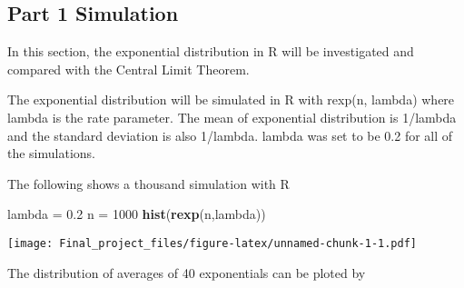 \documentclass[
]{article}
\author{Pulan Yu}
\date{2/24/2020}
\newenvironment{Shaded}{\begin{snugshade}}{\end{snugshade}}
\newcommand{\DecValTok}[1]{\textcolor[rgb]{0.00,0.00,0.81}{#1}}
\newcommand{\FloatTok}[1]{\textcolor[rgb]{0.00,0.00,0.81}{#1}}
\newcommand{\KeywordTok}[1]{\textcolor[rgb]{0.13,0.29,0.53}{\textbf{#1}}}
\newcommand{\NormalTok}[1]{#1}
\newcommand{\StringTok}[1]{\textcolor[rgb]{0.31,0.60,0.02}{#1}}
\begin{document}
\hypertarget{part-1-simulation}{%
\subsection{Part 1 Simulation}\label{part-1-simulation}}

In this section, the exponential distribution in R will be investigated
and compared with the Central Limit Theorem.

The exponential distribution will be simulated in R with rexp(n, lambda)
where lambda is the rate parameter. The mean of exponential distribution
is 1/lambda and the standard deviation is also 1/lambda. lambda was set
to be 0.2 for all of the simulations.

The following shows a thousand simulation with R

\begin{Shaded}
\begin{Highlighting}[]
\NormalTok{    lambda =}\StringTok{ }\FloatTok{0.2}
\NormalTok{    n =}\StringTok{ }\DecValTok{1000}
    \KeywordTok{hist}\NormalTok{(}\KeywordTok{rexp}\NormalTok{(n,lambda))}
\end{Highlighting}
\end{Shaded}

\texttt{[image: Final\_project\_files/figure-latex/unnamed-chunk-1-1.pdf]}

The distribution of averages of 40 exponentials can be ploted by
\end{document}
